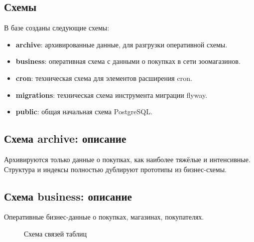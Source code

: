 \subsection{Схемы}\label{subsec:-schemas:-}
В базе созданы следующие схемы:
\begin{itemize}
    \item \textbf{archive}: архивированные данные, для разгрузки оперативной схемы.
    \item \textbf{business}: оперативная схема с данными о покупках в сети зоомагазинов.
    \item \textbf{cron}: техническая схема для элементов расширения cron.
    \item \textbf{migrations}: техническая схема инструмента миграции flyway.
    \item \textbf{public}: общая начальная схема PostgreSQL\@.
\end{itemize}

\subsection{Схема archive: описание}\label{subsec:-archive:-}

Архивируются только данные о покупках, как наиболее тяжёлые и интенсивные.
Структура и индексы полностью дублируют прототипы из бизнес-схемы.

\subsection{Схема business: описание}\label{subsec:-business:-}

Оперативные бизнес-данные о покупках, магазинах, покупателях.

\begin{figure}[h]
    \centering
    \caption{Схема связей таблиц}\label{fig:figure-tables}
\end{figure}

